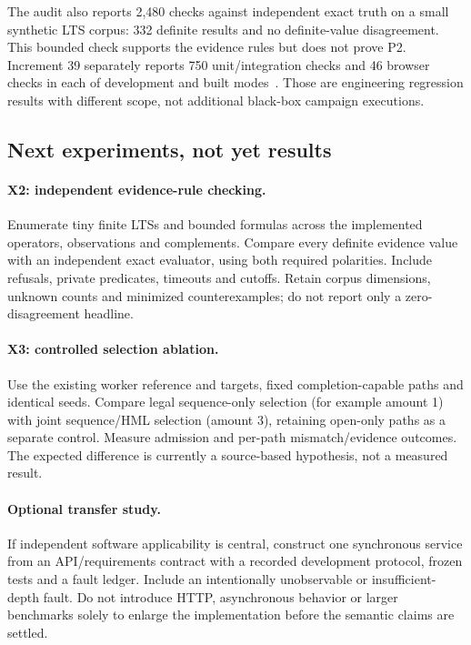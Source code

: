 The audit also reports 2,480 checks against independent exact truth on a small
synthetic LTS corpus: 332 definite results and no definite-value disagreement.
This bounded check supports the evidence rules but does not prove P2. Increment
39 separately reports 750 unit/integration checks and 46 browser checks in each
of development and built modes~\cite{increment39}. Those are engineering regression
results with different scope, not additional black-box campaign executions.

\subsection{Next experiments, not yet results}
\paragraph{X2: independent evidence-rule checking.}
Enumerate tiny finite LTSs and bounded formulas across the implemented operators,
observations and complements. Compare every definite evidence value with an
independent exact evaluator, using both required polarities. Include refusals,
private predicates, timeouts and cutoffs. Retain corpus dimensions, unknown counts
and minimized counterexamples; do not report only a zero-disagreement headline.

\paragraph{X3: controlled selection ablation.}
Use the existing worker reference and targets, fixed completion-capable paths and
identical seeds. Compare legal sequence-only selection (for example amount 1) with
joint sequence/HML selection (amount 3), retaining open-only paths as a separate
control. Measure admission and per-path mismatch/evidence outcomes. The expected
difference is currently a source-based hypothesis, not a measured result.

\paragraph{Optional transfer study.}
If independent software applicability is central, construct one synchronous service
from an API/requirements contract with a recorded development protocol, frozen
tests and a fault ledger. Include an intentionally unobservable or insufficient-depth
fault. Do not introduce HTTP, asynchronous behavior or larger benchmarks solely
to enlarge the implementation before the semantic claims are settled.
